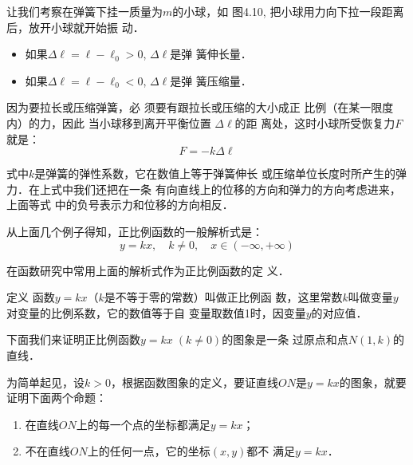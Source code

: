 \begin{figure}[htp]
    \centering
{}
    \caption{}
\end{figure}
\begin{example}
    让我们考察在弹簧下挂一质量为$m$的小球，如
图4.10, 把小球用力向下拉一段距离后，放开小球就开始振
动．
\begin{itemize}
    \item 如果$\Delta \ell=\ell-\ell_0>0$, $\Delta \ell$是弹
簧伸长量．
\item 如果$\Delta \ell=\ell-\ell_0<0$, $\Delta \ell$是弹
簧压缩量．
\end{itemize}

因为要拉长或压缩弹簧，必
须要有跟拉长或压缩的大小成正
比例（在某一限度内）的力，因此
当小球移到离开平衡位置 $\Delta \ell$的距
离处，这时小球所受恢复力$F$就是：
\[F=-k \Delta \ell\]

式中$k$是弹簧的弹性系数，它在数值上等于弹簧伸长
或压缩单位长度时所产生的弹力．在上式中我们还把在一条
有向直线上的位移的方向和弹力的方向考虑进来，上面等式
中的负号表示力和位移的方向相反．
\end{example}

从上面几个例子得知，正比例函数的一般解析式是：
\[y=kx,\quad  k\ne 0,\quad  x\in(-\infty,+\infty)\]

在函数研究中常用上面的解析式作为正比例函数的定
义．

\begin{blk}{定义}
    函数$y=kx$（$k$是不等于零的常数）叫做正比例函
数，这里常数$k$叫做变量$y$对变量的比例系数，它的数值等于自
变量取数值1时，因变量$y$的对应值．
\end{blk}

下面我们来证明正比例函数$y=kx\; (k\ne 0)$的图象是一条
过原点和点$N(1,k)$的直线．

为简单起见，设$k>0$，根据函数图象的定义，要证直线$ON$是$y=kx$的图象，就要证明下面两个命题：
\begin{enumerate}
    \item 在直线$ON$上的每一个点的坐标都满足$y=kx$；
    \item 不在直线$ON$上的任何一点，它的坐标$(x,y)$都不
满足$y=kx$．
\end{enumerate}


